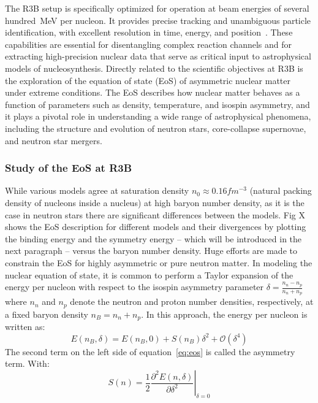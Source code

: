 The R3B setup is specifically optimized for operation at beam energies of several hundred~MeV per nucleon. It provides precise tracking and unambiguous particle identification, with excellent resolution in time, energy, and position~\cite{heil2022new}. These capabilities are essential for disentangling complex reaction channels and for extracting high-precision nuclear data that serve as critical input to astrophysical models of nucleosynthesis.\newline
Directly related to the scientific objectives at R3B is the exploration of the equation of state (EoS) of asymmetric nuclear matter under extreme conditions. The EoS describes how nuclear matter behaves as a function of parameters such as density, temperature, and isospin asymmetry, and it plays a pivotal role in understanding a wide range of astrophysical phenomena, including the structure and evolution of neutron stars, core-collapse supernovae, and neutron star mergers.\newline

\subsubsection{Study of the EoS at R3B}

While various models agree at saturation density $n_0 \approx 0.16 fm^{-3}$  (natural packing density of nucleons inside a nucleus) at high baryon number density, as it is the case in neutron stars there are significant differences between the models. Fig X shows the EoS description for different models and their divergences by plotting the binding energy and the symmetry energy -- which will be introduced in the next paragraph -- versus the baryon number density. 
Huge efforts are made to constrain the EoS for highly asymmetric or pure neutron matter. \newline
In modeling the nuclear equation of state, it is common to perform a Taylor expansion of the energy per nucleon with respect to the isospin asymmetry parameter $\delta = \frac{n_n -n_p}{n_n + n_p}$ where $n_n$ and $n_p$ denote the neutron and proton number densities, respectively, at a fixed baryon density $n_B = n_n +n_p$. In this approach, the energy per nucleon is written as:
\begin{equation}\label{eq:eos}
E(n_B,\delta)=E(n_B,0)+S(n_B)\delta^2+\mathcal{O}(\delta^4)
\end{equation}
The second term on the left side of equation~\ref{eq:eos}  is called the asymmetry term. With:
\begin{equation}
S(n) = \frac{1}{2} \left. \frac{\partial^2 E(n, \delta)}{\partial \delta^2} \right|_{\delta = 0}
\end{equation}

